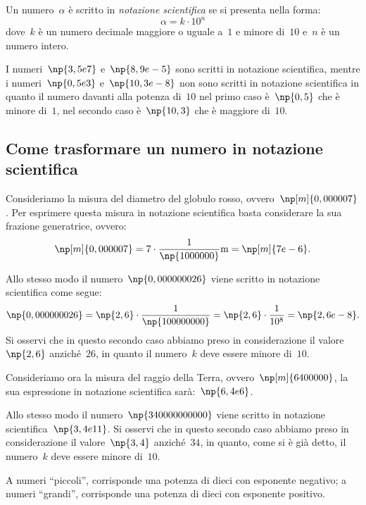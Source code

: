 \begin{definizione}
Un numero~$\alpha$ è scritto in \emph{notazione scientifica} se
si presenta nella forma:
\[\alpha=k\cdot10^n\] 
dove~$k$ è un numero decimale maggiore o uguale a~$1$ e minore di~$10$ e~$n$ è un numero intero.
\end{definizione}

\begin{exrig}
 \begin{esempio}
I numeri~$\np{3,5e7}$ e~$\np{8,9e-5}$ sono scritti in notazione scientifica,
mentre i numeri~$\np{0,5e3}$ e~$\np{10,3e-8}$ non sono scritti in notazione scientifica
in quanto il numero davanti alla potenza di~$10$ nel primo caso è~$\np{0,5}$ che è minore di~$1$,
nel secondo caso è~$\np{10,3}$ che è maggiore di~$10$.
 \end{esempio}
\end{exrig}

\subsection{Come trasformare un numero in notazione scientifica}
Consideriamo la misura del diametro del globulo rosso, ovvero~$\np[m]{0,000007}$.
Per esprimere questa misura in notazione scientifica basta considerare la sua frazione generatrice, ovvero:
\[\np[m]{0,000007}=7\cdot\frac{1}{\np{1000000}}\unit{m}=\np[m]{7e-6}.\]

Allo stesso modo il numero~$\np{0,000000026}$ viene scritto in notazione scientifica come segue:
\[\np{0,000000026}=\np{2,6}\cdot\frac{1}{\np{100000000}}=\np{2,6}\cdot\frac{1}{10^8}=\np{2,6e-8}.\]
Si osservi che in questo secondo caso abbiamo preso in considerazione il valore~$\np{2,6}$ anziché~$26$, in quanto
il numero~$k$ deve essere minore di~$10$.

Consideriamo ora la misura del raggio della Terra, ovvero~$\np[m]{6400000}$,
la sua espressione in notazione scientifica sarà:~$\np{6,4e6}$.

Allo stesso modo il numero~$\np{340000000000}$ viene scritto in notazione scientifica~$\np{3,4e11}$.
Si osservi che in questo secondo caso abbiamo preso in considerazione il valore~$\np{3,4}$ anziché~$34$, in quanto,
come si è già detto, il numero~$k$ deve essere minore di~$10$.

\osservazione A numeri ``piccoli'', corrisponde una potenza di dieci con esponente negativo;
a numeri ``grandi'', corrisponde una potenza di dieci con esponente positivo.

